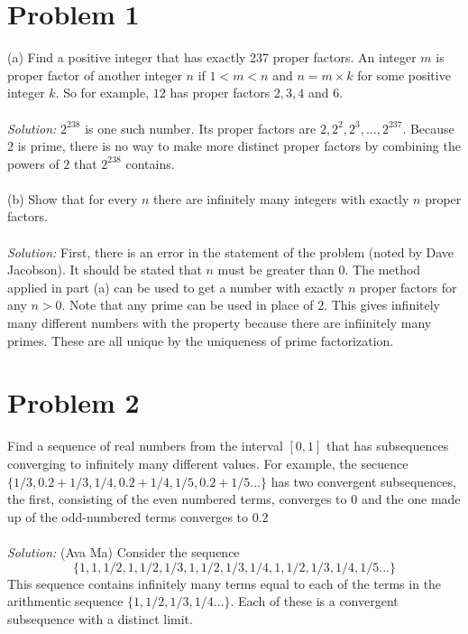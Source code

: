 \documentclass[11pt,a4paper]{report}
\theoremstyle{plain}
\theoremstyle{definition}
\theoremstyle{remark}
\begin{document}
	
	\section*{Problem 1}
	(a) Find a positive integer that has exactly 237 proper factors.  An integer $m$ is proper factor of another integer $n$ if $1 < m < n$ and $n = m \times k$ for some positive integer $k$.  So for example, $12$ has proper factors $2,3,4$ and $6$.
	\\ \\
	\emph{Solution:}  $2^{238}$ is one such number.  Its proper factors are $2, 2^2, 2^3, ..., 2^{237}$.  Because $2$ is prime, there is no way to make more distinct proper factors by combining the powers of $2$ that $2^{238}$ contains.
	\\\\
	(b) Show that for every $n$ there are infinitely many integers with exactly $n$ proper factors.
	\\\\
	\emph{Solution:} First, there is an error in the statement of the problem (noted by Dave Jacobson).  It should be stated that $n$ must be greater than 0.  The method applied in part (a) can be used to get a number with exactly $n$ proper factors for any $n > 0$.  Note that any prime can be used in place of $2$.  This gives infinitely many different numbers with the property because there are infiinitely many primes.  These are all unique by the uniqueness of prime factorization.
	
	\section*{Problem 2}
	Find a sequence of real numbers from the interval $[0,1]$ that has subsequences converging to infinitely many different values.   For example, the secuence $\{1/3, 0.2 + 1/3, 1/4, 0.2 + 1/4, 1/5, 0.2 + 1/5 ...\}$ has two convergent subsequences, the first, consisting of the even numbered terms, converges to $0$ and the one made up of the odd-numbered terms converges to $0.2$
	\\\\
	\emph{Solution:} (Ava Ma) Consider the sequence $$\{1, 1, 1/2, 1, 1/2, 1/3, 1, 1/2, 1/3, 1/4, 1, 1/2, 1/3, 1/4, 1/5...\}$$ This sequence contains infinitely many terms equal to each of  the terms in the arithmentic sequence $\{1, 1/2, 1/3, 1/4...\}$.  Each of these is a convergent  subsequence with a distinct limit.
	
	\pagebreak
	
\end{document}
